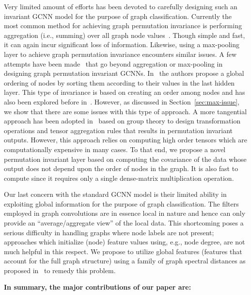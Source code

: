 \documentclass{article}
\begin{document}
Very limited amount of efforts has been devoted to carefully designing such an invariant GCNN model for the purpose of graph classification. Currently the most common  method for achieving graph permutation invariance  is performing aggregation (i.e., summing) over all graph node values~\cite{atwood2016diffusion, dai2016discriminative, zhao2018substructure, simonovsky2017dynamic}. Though  simple and fast, it can again incur significant loss of information.  Likewise, using a max-pooling layer to achieve graph permutation invariance encounters similar issues. A few attempts have been made~\cite{zhang2018end, kondor2018covariant} that go beyond aggregation or max-pooling in designing graph permutation invariant GCNNs. In~\cite{zhang2018end} the authors  propose a global ordering of nodes by sorting them according to their   values in the last hidden layer. This type of invariance is based on  creating an order among nodes and has also been explored before in~\cite{niepert2016learning}. However, as discussed in Section~\ref{sec:max-issue}, we show that there  are some issues with this type of approach. A more tangential approach  has been adopted in~\cite{kondor2018covariant} based on group theory to  design transformation operations and tensor aggregation rules that results in permutation invariant outputs. However, this approach relies on computing high order tensors which are computationally  expensive in many cases. 
To that end, we propose a novel permutation invariant layer based on computing the covariance of the data whose output does not depend upon the order of nodes in the graph. It is also fast to compute since it requires only a single dense-matrix multiplication operation.

Our last concern with the standard GCNN model  is their limited ability in exploiting global information for the purpose of  graph classification. The  filters employed in graph convolutions  are in essence  local in nature and hence can only provide an ``average/aggregate view'' of the local    data. This shortcoming poses a serious difficulty in handling graphs  where node labels are not present; approaches which initialize (node) feature values using, e.g.,  node degree, are not much helpful in this respect.   We propose to utilize global features (features that account for the full graph structure)  using a family of graph spectral distances as proposed in~\cite{verma2017hunt} to remedy this problem.


\textbf{In summary, the major contributions of our paper are: }
 
\end{document}
